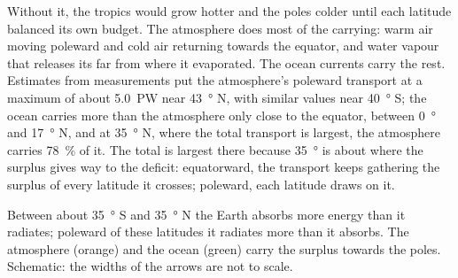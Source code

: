 Without it, the tropics would grow hotter and the poles colder until each
latitude balanced its own budget. The atmosphere does most of the carrying:
warm air moving poleward and cold air returning towards the equator, and
water vapour that releases its  far from where it evaporated. The
ocean currents carry the rest. Estimates from measurements put the
atmosphere's poleward transport at a maximum of about \qty{5.0}{PW} near
\qty{43}{\degree} N, with similar values near \qty{40}{\degree} S; the ocean
carries more than the atmosphere only close to the equator, between
\qty{0}{\degree} and \qty{17}{\degree} N, and at \qty{35}{\degree} N, where
the total transport is largest, the atmosphere carries \qty{78}{\percent} of
it. The total is largest there because \qty{35}{\degree} is about where the
surplus gives way to the deficit: equatorward, the transport keeps gathering
the surplus of every latitude it crosses; poleward, each latitude draws on
it.

\begin{omfigure}

{\small Between about \qty{35}{\degree} S and \qty{35}{\degree} N the Earth
absorbs more energy than it radiates; poleward of these latitudes it
radiates more than it absorbs. The atmosphere (orange) and the ocean (green)
carry the surplus towards the poles. Schematic: the widths of the arrows are
not to scale.}
\end{omfigure}

